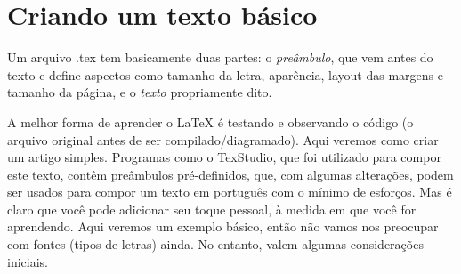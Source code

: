 \documentclass[a4paper,nols,bidi,nohyper]{tufte-book}
\begin{document}
\chapter{Criando um texto básico}

Um arquivo .tex tem basicamente duas partes: o \textit{preâmbulo}, que vem antes do texto e define aspectos como tamanho da letra, aparência, layout das margens e tamanho da página, e o \textit{texto} propriamente dito.

A melhor forma de aprender o \LaTeX{} é testando e observando o código (o arquivo original antes de ser compilado/diagramado). Aqui veremos como criar um artigo simples. Programas como o TexStudio, que foi utilizado para compor este texto, contêm preâmbulos pré-definidos, que, com algumas alterações, podem ser usados para compor um texto em português com o mínimo de esforços. Mas é claro que você pode adicionar seu toque pessoal, à medida em que você for aprendendo. Aqui veremos um exemplo básico, então não vamos nos preocupar com fontes (tipos de letras) ainda. No entanto, valem algumas considerações iniciais.

%
%
%
%
\end{document}
